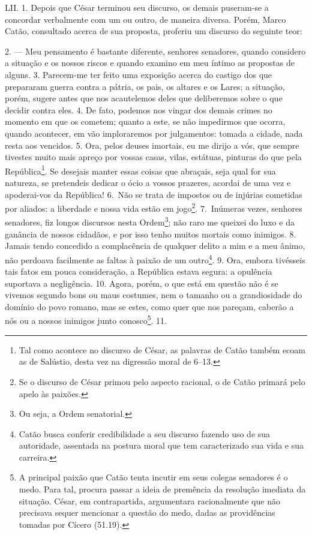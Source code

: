 LII. 1. Depois que César terminou seu discurso, os demais puseram-se a concordar 
verbalmente com um ou outro, de maneira diversa. Porém, Marco Catão, consultado
acerca de sua proposta, proferiu um discurso do seguinte teor: 

2. --- Meu pensamento é bastante diferente, senhores senadores, quando considero a
situação e os nossos riscos e quando examino em meu íntimo as propostas de
alguns. 3. Parecem-me ter feito uma exposição acerca do castigo dos que
prepararam guerra contra a pátria, os pais, os altares e os Lares; a situação,
porém, sugere antes que nos acautelemos deles que deliberemos sobre o que
decidir contra eles. 4. De fato, podemos nos vingar dos demais crimes no
momento em que os cometem; quanto a este, se não impedirmos que ocorra, quando
acontecer, em vão imploraremos por julgamentos: tomada a cidade, nada resta aos
vencidos. 5. Ora, pelos deuses imortais, eu me dirijo a vós, que sempre
tivestes muito mais apreço por vossas casas, vilas, estátuas, pinturas do que
pela República\footnote{Tal como acontece no discurso de César, as palavras de
Catão também ecoam as de Salústio, desta vez na digressão moral de 6--13.}. Se
desejais manter essas coisas que abraçais, seja qual for sua natureza, se
pretendeis dedicar o ócio a vossos prazeres, acordai de uma vez e apoderai-vos
da República! 6.~Não se trata de impostos ou de injúrias cometidas por aliados:
a liberdade e nossa vida estão em jogo\footnote{Se o discurso de César primou
pelo aspecto racional, o de Catão primará pelo apelo às paixões.}. 7.~Inúmeras
vezes, senhores senadores, fiz longos discursos nesta Ordem\footnote{Ou seja, a Ordem senatorial.}; não raro me
queixei do luxo e da ganância de nossos cidadãos, e por isso tenho muitos
mortais como inimigos. 8. Jamais tendo concedido a complacência de qualquer
delito a mim e a meu ânimo, não perdoava facilmente as faltas à paixão de um
outro\footnote{Catão busca conferir credibilidade a seu discurso fazendo uso de
sua autoridade, assentada na postura moral que tem caracterizado sua vida e sua
carreira.}. 9. Ora, embora tivésseis tais fatos em pouca consideração, a
República estava segura: a opulência suportava a negligência. 10. Agora, porém,
o que está em questão não é se vivemos segundo bons ou maus costumes, nem o tamanho
ou a grandiosidade do domínio do povo romano, mas se estes, como quer que nos
pareçam, caberão a nós ou a nossos inimigos junto conosco\footnote{A principal
paixão que Catão tenta incutir em seus colegas senadores é o medo. Para tal,
procura passar a ideia de premência da resolução imediata da situação. César,
em contrapartida, argumentara racionalmente que não precisava sequer mencionar
a questão do medo, dadas as providências tomadas por Cícero (51.19).}. 11.
